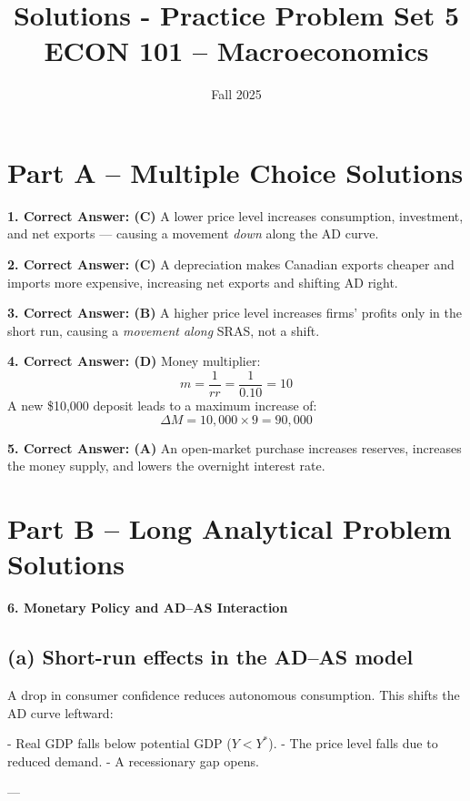 \documentclass[12pt]{article}
\title{Solutions - Practice Problem Set 5\\ \vspace{15pt} \large ECON 101 -- Macroeconomics}
\author{}
\date{Fall 2025}
\begin{document}
\maketitle

\section*{Part A – Multiple Choice Solutions}

\textbf{1. Correct Answer: (C)}  
A lower price level increases consumption, investment, and net exports — causing a movement \emph{down} along the AD curve.



\textbf{2. Correct Answer: (C)}  
A depreciation makes Canadian exports cheaper and imports more expensive, increasing net exports and shifting AD right.



\textbf{3. Correct Answer: (B)}  
A higher price level increases firms’ profits only in the short run, causing a \emph{movement along} SRAS, not a shift.



\textbf{4. Correct Answer: (D)}  
Money multiplier:  
\[
m = \frac{1}{rr} = \frac{1}{0.10} = 10
\]
A new \$10,000 deposit leads to a maximum increase of:  
\[
\Delta M = 10{,}000 \times 9 = 90{,}000
\]



\textbf{5. Correct Answer: (A)}  
An open-market purchase increases reserves, increases the money supply, and lowers the overnight interest rate.


\newpage
\section*{Part B – Long Analytical Problem Solutions}

\textbf{6. Monetary Policy and AD–AS Interaction}

\subsection*{(a) Short-run effects in the AD–AS model}

A drop in consumer confidence reduces autonomous consumption.  
This shifts the AD curve leftward:

- Real GDP falls below potential GDP (\(Y < Y^*\)).  
- The price level falls due to reduced demand.  
- A recessionary gap opens.

---
\end{document}
